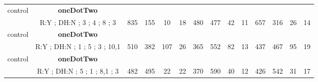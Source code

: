 \begin{table}[H]
{\begin{tabular}{|c|c|c|c|c|c|c|c|c|c|c|c|c|c|}
control & \cellcolor{blue!15}\textbf{oneDotTwo}& {\color[HTML]{00009B} } & {\color[HTML]{9A0000} } & {\color[HTML]{009901} } &  & {\color[HTML]{00009B} } & {\color[HTML]{9A0000} } & {\color[HTML]{009901} } &  & {\color[HTML]{00009B} } & {\color[HTML]{9A0000} } & {\color[HTML]{009901} } &  \\ 
 & \cellcolor{ blue!15}R:Y ; DH:N ; 3 ; 4 ; 8 ; 3 & \multirow{-2}{*}{{\color[HTML]{00009B} 835}} & \multirow{-2}{*}{{\color[HTML]{9A0000} 155}} & \multirow{-2}{*}{{\color[HTML]{009901} 10}} & \multirow{-2}{*}{18} & \multirow{-2}{*}{{\color[HTML]{00009B} 480}} & \multirow{-2}{*}{{\color[HTML]{9A0000} 477}} & \multirow{-2}{*}{{\color[HTML]{009901} 42}} & \multirow{-2}{*}{11} & \multirow{-2}{*}{{\color[HTML]{00009B} 657}} & \multirow{-2}{*}{{\color[HTML]{9A0000} 316}} & \multirow{-2}{*}{{\color[HTML]{009901} 26}} & \multirow{-2}{*}{14} \\ \hline

control & \cellcolor{blue!15}\textbf{oneDotTwo}& {\color[HTML]{00009B} } & {\color[HTML]{9A0000} } & {\color[HTML]{009901} } &  & {\color[HTML]{00009B} } & {\color[HTML]{9A0000} } & {\color[HTML]{009901} } &  & {\color[HTML]{00009B} } & {\color[HTML]{9A0000} } & {\color[HTML]{009901} } &  \\ 
 & \cellcolor{ blue!15}R:Y ; DH:N ; 1 ; 5 ; 3 ; 10,1 & \multirow{-2}{*}{{\color[HTML]{00009B} 510}} & \multirow{-2}{*}{{\color[HTML]{9A0000} 382}} & \multirow{-2}{*}{{\color[HTML]{009901} 107}} & \multirow{-2}{*}{26} & \multirow{-2}{*}{{\color[HTML]{00009B} 365}} & \multirow{-2}{*}{{\color[HTML]{9A0000} 552}} & \multirow{-2}{*}{{\color[HTML]{009901} 82}} & \multirow{-2}{*}{13} & \multirow{-2}{*}{{\color[HTML]{00009B} 437}} & \multirow{-2}{*}{{\color[HTML]{9A0000} 467}} & \multirow{-2}{*}{{\color[HTML]{009901} 95}} & \multirow{-2}{*}{19} \\ \hline

control & \cellcolor{blue!15}\textbf{oneDotTwo}& {\color[HTML]{00009B} } & {\color[HTML]{9A0000} } & {\color[HTML]{009901} } &  & {\color[HTML]{00009B} } & {\color[HTML]{9A0000} } & {\color[HTML]{009901} } &  & {\color[HTML]{00009B} } & {\color[HTML]{9A0000} } & {\color[HTML]{009901} } &  \\ 
 & \cellcolor{ blue!15}R:Y ; DH:N ; 5 ; 1 ; 8,1 ; 3 & \multirow{-2}{*}{{\color[HTML]{00009B} 482}} & \multirow{-2}{*}{{\color[HTML]{9A0000} 495}} & \multirow{-2}{*}{{\color[HTML]{009901} 22}} & \multirow{-2}{*}{22} & \multirow{-2}{*}{{\color[HTML]{00009B} 370}} & \multirow{-2}{*}{{\color[HTML]{9A0000} 590}} & \multirow{-2}{*}{{\color[HTML]{009901} 40}} & \multirow{-2}{*}{12} & \multirow{-2}{*}{{\color[HTML]{00009B} 426}} & \multirow{-2}{*}{{\color[HTML]{9A0000} 542}} & \multirow{-2}{*}{{\color[HTML]{009901} 31}} & \multirow{-2}{*}{17} \\ \hline


\end{tabular}}
\end{table}
